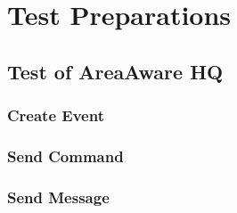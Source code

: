 %
\thispagestyle{fancy}
\chapter{Test Preparations}
\label{chp:test_prep}

\section{Test of AreaAware HQ}
\subsection{Create Event}

\subsection{Send Command}

\subsection{Send Message}



